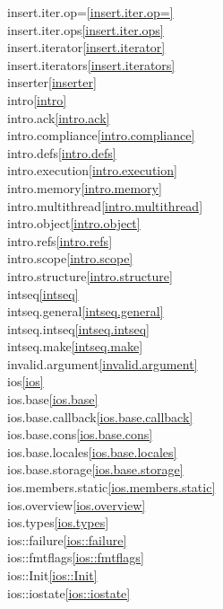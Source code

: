 \begin{multicols}{2}
insert.iter.op=\quad\ref{insert.iter.op=}\\
insert.iter.ops\quad\ref{insert.iter.ops}\\
insert.iterator\quad\ref{insert.iterator}\\
insert.iterators\quad\ref{insert.iterators}\\
inserter\quad\ref{inserter}\\
intro\quad\ref{intro}\\
intro.ack\quad\ref{intro.ack}\\
intro.compliance\quad\ref{intro.compliance}\\
intro.defs\quad\ref{intro.defs}\\
intro.execution\quad\ref{intro.execution}\\
intro.memory\quad\ref{intro.memory}\\
intro.multithread\quad\ref{intro.multithread}\\
intro.object\quad\ref{intro.object}\\
intro.refs\quad\ref{intro.refs}\\
intro.scope\quad\ref{intro.scope}\\
intro.structure\quad\ref{intro.structure}\\
intseq\quad\ref{intseq}\\
intseq.general\quad\ref{intseq.general}\\
intseq.intseq\quad\ref{intseq.intseq}\\
intseq.make\quad\ref{intseq.make}\\
invalid.argument\quad\ref{invalid.argument}\\
ios\quad\ref{ios}\\
ios.base\quad\ref{ios.base}\\
ios.base.callback\quad\ref{ios.base.callback}\\
ios.base.cons\quad\ref{ios.base.cons}\\
ios.base.locales\quad\ref{ios.base.locales}\\
ios.base.storage\quad\ref{ios.base.storage}\\
ios.members.static\quad\ref{ios.members.static}\\
ios.overview\quad\ref{ios.overview}\\
ios.types\quad\ref{ios.types}\\
ios::failure\quad\ref{ios::failure}\\
ios::fmtflags\quad\ref{ios::fmtflags}\\
ios::Init\quad\ref{ios::Init}\\
ios::iostate\quad\ref{ios::iostate}\\

\end{multicols}
